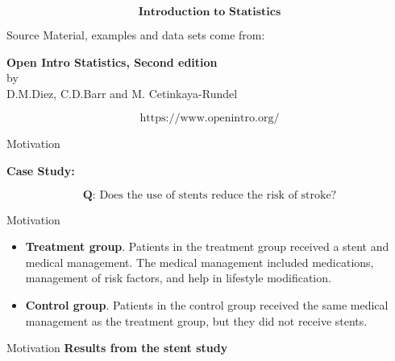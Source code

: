 \documentclass[12pt,a4paper]{beamer}
\begin{document}
\begin{frame}

\[\textbf{Introduction to Statistics}\]
\end{frame}
\begin{frame}{Source}
\centering
Material, examples and data sets come from:\vspace{0.3cm}

\textbf{Open Intro Statistics, Second edition}\\
by\\
D.M.Diez, C.D.Barr and M. Cetinkaya-Rundel



\[\text{https://www.openintro.org/}\]
\end{frame}
\begin{frame}{Motivation}

\textbf{Case Study:}

\[\textbf{Q:}\text{ Does the use of stents reduce the risk of stroke?}\]
\end{frame}
\begin{frame}{Motivation}
\small\begin{itemize}
\item[]\textbf{Treatment group}. Patients in the treatment group received a stent and medical management. The medical management included medications, management of risk factors, and help in lifestyle modification.
\item[]\textbf{Control group}. Patients in the control group received the same medical management as the treatment group, but they did not receive stents.
\end{itemize}
\end{frame}
\begin{frame}{Motivation}
\textbf{Results from the stent study}
\begin{table}[h]
\centering
{}
\end{table}
\end{frame}
\end{document}
